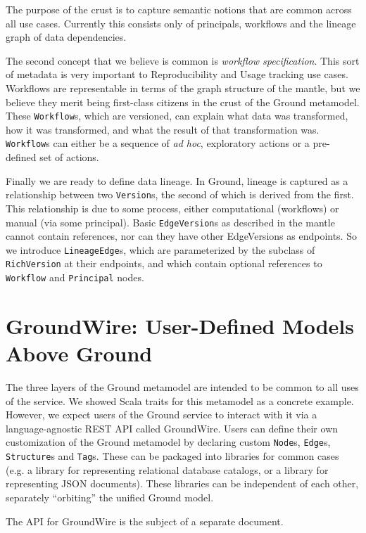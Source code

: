 \documentclass{article}
\newenvironment{tldr}[1][r]
  {\wrapfigure{#1}{0.33\textwidth}\tcolorbox}
  {\endtcolorbox\endwrapfigure}
\newcommand{\mantle}{mantle\xspace}
\newcommand{\crust}{crust\xspace}
\newcommand{\version}{\texttt{Version}\xspace}
\newcommand{\richversion}{\texttt{RichVersion}\xspace}
\newcommand{\node}{\texttt{Node}\xspace}
\newcommand{\edge}{\texttt{Edge}\xspace}
\newcommand{\structure}{\texttt{Structure}\xspace}
\newcommand{\tag}{\texttt{Tag}\xspace}
\newcommand{\lineagegraph}{lineage graph\xspace}
\newcommand{\groundwire}{GroundWire\xspace}
\begin{document}
\begin{tldr}
The purpose of the \crust is to capture semantic notions that are common across all use cases.  Currently this consists only of principals, workflows and the \lineagegraph of data dependencies.
\end{tldr}

The second concept that we believe is common is \emph{workflow specification}.
This sort of metadata is very important to Reproducibility and Usage tracking use cases.
Workflows are representable in terms of the graph
structure of the \mantle, but we believe they merit being
first-class citizens in the \crust of the Ground metamodel. These
\texttt{Workflow}s,
which are versioned, can explain what data was transformed, how it was
transformed, and what the result of that transformation was. \texttt{Workflow}s
can either be a sequence of \textit{ad hoc}, exploratory actions or a
pre-defined set of actions.

Finally we are ready to define data lineage.  In Ground, lineage
is captured as a relationship between two {\version}s, the second of which is derived from the
first. This relationship is due to some process, either computational
(workflows) or manual (via some principal). Basic \texttt{EdgeVersion}s as described
in the \mantle cannot contain references, nor can they have other {EdgeVersion}s as endpoints.  
So we introduce \texttt{LineageEdge}s, which are parameterized by the subclass of \richversion at their
endpoints, and which contain 
optional references to \texttt{Workflow} and \texttt{Principal} nodes.

\section{\groundwire: User-Defined Models Above Ground}
The three layers of the Ground metamodel are intended to be common to all uses of the service.  We 
showed Scala traits for this metamodel as a concrete example.  However, we expect users of the Ground
service to interact with it via a language-agnostic REST API called \groundwire.  Users can define their own
customization of the Ground metamodel by declaring custom {\node}s, {\edge}s, {\structure}s and {\tag}s.  
These can be packaged into libraries for common cases (e.g. a library for representing
relational database catalogs, or a library for representing JSON documents).  These libraries can 
be independent of each other, separately ``orbiting'' the unified Ground model.  

The API for \groundwire is the subject of a separate document.
\end{document}
